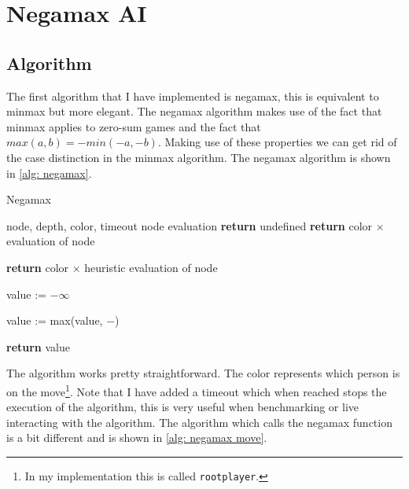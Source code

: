 \documentclass[a4paper]{article}
\begin{document}
\section{Negamax AI}

\subsection{Algorithm}
The first algorithm that I have implemented is negamax, this is equivalent to
minmax but more elegant. The negamax algorithm makes use of the fact that
minmax applies to zero-sum games and the fact that $max(a, b) = -min(-a, -b)$.
Making use of these properties we can get rid of the case distinction in
the minmax algorithm. The negamax algorithm is shown in \ref{alg: negamax}.

\begin{algorithm}
	\caption{Negamax}
	\label{alg: negamax}
	\begin{algorithmic}[1]
		\Require node, depth, color, timeout
		\Ensure node evaluation
				\State \textbf{return} undefined
			\EndIf
				\State \textbf{return} color $\times$ evaluation of node
			\EndIf

				\State \textbf{return} color $\times$ heuristic evaluation of node
			\EndIf

			\State value := $-\infty$

				\State value := max(value, $-$)
			\EndFor

			\State \textbf{return} value
		\EndFunction
	\end{algorithmic}
\end{algorithm}

The algorithm works pretty straightforward. The color represents which person
is on the move\footnote{In my implementation this is called
\texttt{rootplayer}.}. Note that I have added a timeout which when reached
stops the execution of the algorithm, this is very useful when benchmarking or
live interacting with the algorithm. The algorithm which calls the negamax
function is a bit different and is shown in \ref{alg: negamax move}.
\end{document}
